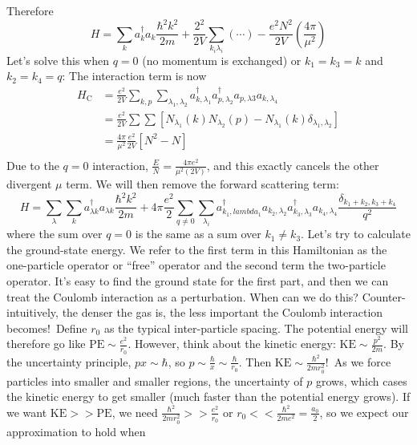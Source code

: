 \documentclass[a4paper,twoside,master.tex]{subfiles}
\begin{document}
Therefore
\begin{equation}
    H = \sum_k a^\dagger_k a_k \frac{\hbar^2 k^2}{2m} + \frac{2^2}{2V} \sum_{k_i \lambda_i} (\cdots) - \frac{e^2 N^2}{2V} \left( \frac{4 \pi}{\mu^2} \right)
\end{equation}
Let's solve this when $ q = 0 $ (no momentum is exchanged) or $ k_1 = k_3 = k $ and $ k_2 = k_4 = q $:
The interaction term is now
\begin{align}
    H_{\text{C}} &= \frac{e^2}{2V} \sum_{k,p} \sum_{\lambda_1, \lambda_2} a^\dagger_{k, \lambda_1} a^\dagger_{p, \lambda_2} a_{p, \lambda 3} a_{k, \lambda_4} \\
    &= \frac{e^2}{2V} \sum \sum \left[ N_{\lambda_1}(k) N_{\lambda_2}(p) - N_{\lambda_1}(k) \delta_{\lambda_1, \lambda_2} \right] \\
    &= \frac{4 \pi}{\mu^2} \frac{e^2}{2V} \left[ N^2 - N \right] \\
\end{align}
Due to the $ q=0 $ interaction, $ \frac{E}{N} = \frac{4 \pi e^2}{\mu^2 (2V)} $, and this exactly cancels the other divergent $ \mu $ term. We will then remove the forward scattering term:
\begin{equation}
    H = \sum_{\lambda} \sum_{k} a^\dagger_{\lambda k} a_{\lambda k} \frac{\hbar^2 k^2}{2m} + 4 \pi \frac{e^2}{2} \sum_{q \neq 0} \sum_{\lambda_i} a_{k_1,lambda_1}^\dagger a_{k_2, \lambda_2} a_{k_3, \lambda_3}^\dagger a_{k_4, \lambda_4} \frac{\delta_{k_1 + k_2, k_3 + k_4}}{q^2}
\end{equation}
where the sum over $ q = 0 $ is the same as a sum over $ k_1 \neq k_3 $. Let's try to calculate the ground-state energy. We refer to the first term in this Hamiltonian as the one-particle operator or ``free'' operator and the second term the two-particle operator. It's easy to find the ground state for the first part, and then we can treat the Coulomb interaction as a perturbation. When can we do this? Counter-intuitively, the denser the gas is, the less important the Coulomb interaction becomes!\ Define $ r_0 $ as the typical inter-particle spacing. The potential energy will therefore go like $ \text{PE} \sim \frac{e^2}{r_0} $. However, think about the kinetic energy: $ \text{KE} \sim \frac{p^2}{2m} $. By the uncertainty principle, $ px \sim \hbar $, so $ p \sim \frac{\hbar}{x} \sim \frac{\hbar}{r_0} $. Then $ \text{KE} \sim \frac{\hbar^2}{2m r_0^2} $!\ As we force particles into smaller and smaller regions, the uncertainty of $ p $ grows, which cases the kinetic energy to get smaller (much faster than the potential energy grows). If we want $ \text{KE} >> \text{PE} $, we need $ \frac{\hbar^2}{2m r_0^2} >> \frac{e^2}{r_0} $ or $ r_0 << \frac{\hbar^2}{2 m e^2} = \frac{a_0}{2} $, so we expect our approximation to hold when
\end{document}
